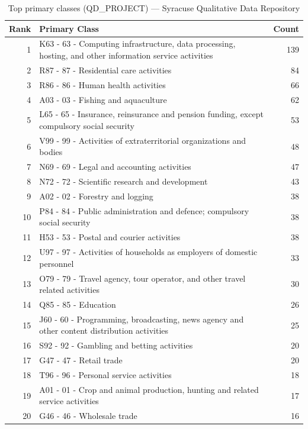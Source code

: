 \begin{table}[H]
    \centering
    \begin{tabular}{r p{10cm} r}
    \hline
    \textbf{Rank} & \textbf{Primary Class} & \textbf{Count} \\
    \hline
    1 & K63 - 63 - Computing infrastructure, data processing, hosting, and other information service activities & 139 \\
    2 & R87 - 87 - Residential care activities & 84 \\
    3 & R86 - 86 - Human health activities & 66 \\
    4 & A03 - 03 - Fishing and aquaculture & 62 \\
    5 & L65 - 65 - Insurance, reinsurance and pension funding, except compulsory social security & 53 \\
    6 & V99 - 99 - Activities of extraterritorial organizations and bodies & 48 \\
    7 & N69 - 69 - Legal and accounting activities & 47 \\
    8 & N72 - 72 - Scientific research and development & 43 \\
    9 & A02 - 02 - Forestry and logging & 38 \\
    10 & P84 - 84 - Public administration and defence; compulsory social security & 38 \\
    11 & H53 - 53 - Postal and courier activities & 38 \\
    12 & U97 - 97 - Activities of households as employers of domestic personnel & 33 \\
    13 & O79 - 79 - Travel agency, tour operator, and other travel related activities & 30 \\
    14 & Q85 - 85 - Education & 26 \\
    15 & J60 - 60 - Programming, broadcasting, news agency and other content distribution activities & 25 \\
    16 & S92 - 92 - Gambling and betting activities & 20 \\
    17 & G47 - 47 - Retail trade & 20 \\
    18 & T96 - 96 - Personal service activities & 18 \\
    19 & A01 - 01 - Crop and animal production, hunting and related service activities & 17 \\
    20 & G46 - 46 - Wholesale trade & 16 \\
    \hline
    \end{tabular}
    \caption{Top primary classes (QD\_PROJECT) --- Syracuse Qualitative Data Repository}
\end{table}


